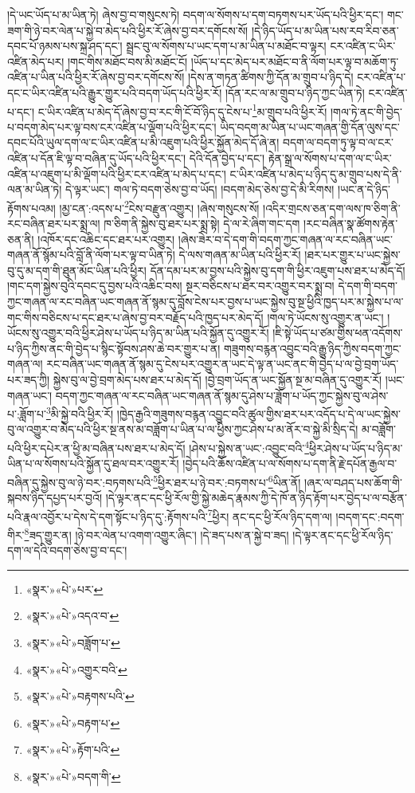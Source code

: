 །དེ་ཡང་ཡོད་པ་མ་ཡིན་ཏེ། ཞེས་བྱ་བ་གསུངས་ཏེ། བདག་ལ་སོགས་པ་དག་བཏགས་པར་ཡོད་པའི་ཕྱིར་དང་། གང་ཟག་གི་ཉེ་བར་ལེན་པ་སྐྱེ་བ་མེད་པའི་ཕྱིར་རོ་ཞེས་བྱ་བར་དགོངས་སོ། །དེ་ཉིད་ཡོད་པ་མ་ཡིན་པས་རབ་རིབ་ཅན་དབང་པོ་ཉམས་པས་སྐྲ་ཤད་དང་། སྦྲང་བུ་ལ་སོགས་པ་ཡང་དག་པ་མ་ཡིན་པ་མཐོང་བ་ལྟར། ངར་འཛིན་ང་ཡིར་འཛིན་མེད་པར། །གང་གིས་མཐོང་བས་མི་མཐོང་ངོ། །ཡོད་པ་དང་མེད་པར་མཐོང་བ་ནི་ལོག་པར་ལྟ་བ་མཆོག་ཏུ་འཛིན་པ་ཡིན་པའི་ཕྱིར་རོ་ཞེས་བྱ་བར་དགོངས་སོ། །དེས་ན་གཏན་ཚིགས་ཀྱི་དོན་མ་གྲུབ་པ་ཉིད་དེ། ངར་འཛིན་པ་དང་ང་ཡིར་འཛིན་པའི་རྒྱུར་གྱུར་པའི་བདག་ཡོད་པའི་ཕྱིར་རོ། །དོན་རང་ལ་མ་གྲུབ་པ་ཉིད་ཀྱང་ཡིན་ཏེ། ངར་འཛིན་པ་དང་། ང་ཡིར་འཛིན་པ་མེད་དོ་ཞེས་བྱ་བ་རང་གི་ངོ་བོ་ཉིད་དུ་ངེས་པ་\footnote{«སྣར་»«པེ་»པར་}མ་གྲུབ་པའི་ཕྱིར་རོ། །གལ་ཏེ་ནང་གི་བྱེད་པ་བདག་མེད་པར་ལྟ་བས་ངར་འཛིན་པ་ལྡོག་པའི་ཕྱིར་དང་། ཡིད་བདག་མ་ཡིན་པ་ཡང་གཞན་གྱི་དོན་ལུས་དང་དབང་པོའི་ཡུལ་དག་ལ་ང་ཡིར་འཛིན་པ་མི་འཇུག་པའི་ཕྱིར་སྐྱོན་མེད་དོ་ཞེ་ན། བདག་ལ་བདག་ཏུ་ལྟ་བ་ལ་ངར་འཛིན་པ་དོན་ཇི་ལྟ་བ་བཞིན་དུ་ཡོད་པའི་ཕྱིར་དང་། དེའི་དོན་བྱེད་པ་དང་། རྟེན་སྒྲ་ལ་སོགས་པ་དག་ལ་ང་ཡིར་འཛིན་པ་འཇུག་པ་མི་ལྡོག་པའི་ཕྱིར་ངར་འཛིན་པ་མེད་པ་དང་། ང་ཡིར་འཛིན་པ་མེད་པ་ཉིད་དུ་མ་གྲུབ་པས་དེ་ནི་ལན་མ་ཡིན་ཏེ། དེ་ལྟར་ཡང་། གལ་ཏེ་བདག་ཅེས་བྱ་བ་ཡོད། །བདག་མེད་ཅེས་བྱ་དེ་མི་རིགས། །ཡང་ན་དེ་ཉིད་རྟོགས་པའམ། །མྱ་ངན་:འདས་པ་\footnote{«སྣར་»«པེ་»འདའ་བ་}ངེས་བརྫུན་འགྱུར། །ཞེས་གསུངས་སོ། །འདིར་གྲངས་ཅན་དག་ལས་ཁ་ཅིག་ནི་རང་བཞིན་ཐར་པར་སྨྲ་ལ། ཁ་ཅིག་ནི་སྐྱེས་བུ་ཐར་པར་སྨྲ་སྟེ། དེ་ལ་རེ་ཞིག་གང་དག །རང་བཞིན་སྣ་ཚོགས་རྟེན་ཅན་ནི། །འཁོར་དང་འཆིང་དང་ཐར་པར་འགྱུར། །ཞེས་ཟེར་བ་དེ་དག་གི་བདག་ཀྱང་གཞན་ལ་རང་བཞིན་ཡང་གཞན་ནོ་སྙོམ་པའི་བློ་ནི་ལོག་པར་ལྟ་བ་ཡིན་ཏེ། དེ་ལས་གཞན་མ་ཡིན་པའི་ཕྱིར་རོ། །ཐར་པར་གྱུར་པ་ཡང་སྐྱེས་བུ་དུ་མ་དག་གི་ཐུན་མོང་ཡིན་པའི་ཕྱིར། དོན་དམ་པར་མ་བྱས་པའི་སྐྱེས་བུ་དག་གི་ཕྱིར་འཇུག་པས་ཐར་པ་མེད་དོ། །གང་དག་སྐྱེས་བུའི་དབང་དུ་བྱས་པའི་འཆིང་བས། སྔར་བཅིངས་པ་ཐར་བར་འགྱུར་བར་སྨྲ་བ། དེ་དག་གི་བདག་ཀྱང་གཞན་ལ་རང་བཞིན་ཡང་གཞན་ནོ་སྙམ་དུ་བློས་ངེས་པར་བྱས་པ་ཡང་སྐྱེས་བུ་སྔ་ཕྱིའི་ཁྱད་པར་མ་སྐྱེས་པ་ལ་གང་གིས་བཅིངས་པ་དང་ཐར་པ་ཞེས་བྱ་བར་བརྗོད་པའི་ཁྱད་པར་མེད་དོ། །གལ་ཏེ་ཡོངས་སུ་འགྱུར་ན་ཡང་། །ཡོངས་སུ་འགྱུར་བའི་ཕྱིར་ཤེས་པ་ཡོད་པ་ཉིད་མ་ཡིན་པའི་སྐྱོན་དུ་འགྱུར་རོ། །ཇི་སྟེ་ཡོད་པ་ཙམ་གྱིས་ཕན་འདོགས་པ་ཉིད་ཀྱིས་ནང་གི་བྱེད་པ་སྙིང་སྟོབས་ཤས་ཆེ་བར་གྱུར་པ་ན། གཟུགས་བརྙན་འབྱུང་བའི་རྒྱུ་ཉིད་ཀྱིས་བདག་ཀྱང་གཞན་ལ། རང་བཞིན་ཡང་གཞན་ནོ་སྙམ་དུ་ངེས་པར་འགྱུར་ན་ཡང་དེ་ལྟ་ན་ཡང་ནང་གི་བྱེད་པ་ལ་བྱེ་བྲག་ཡོད་པར་ཟད་ཀྱི། སྐྱེས་བུ་ལ་བྱེ་བྲག་མེད་པས་ཐར་པ་མེད་དོ། །བྱེ་བྲག་ཡོད་ན་ཡང་སྐྱོན་སྔ་མ་བཞིན་དུ་འགྱུར་རོ། །ཡང་གཞན་ཡང་། བདག་ཀྱང་གཞན་ལ་རང་བཞིན་ཡང་གཞན་ནོ་སྙམ་དུ་ཤེས་པ་ཟློག་པ་ཡོད་ཀྱང་སྐྱེས་བུ་ལ་ཤེས་པ་:ཟློག་པ་\footnote{«སྣར་»«པེ་»བཟློག་པ་}མི་སྐྱེ་བའི་ཕྱིར་རོ། །ཁྱེད་རྒྱའི་གཟུགས་བརྙན་འབྱུང་བའི་ཚུལ་གྱིས་ཐར་པར་འདོད་པ་དེ་ལ་ཡང་སྐྱེས་བུ་ལ་འགྱུར་བ་མེད་པའི་ཕྱིར་སྔ་ནས་མ་བཟློག་པ་ཡིན་པ་ལ་ཕྱིས་ཀྱང་ཤེས་པ་མ་ནོར་བ་སྐྱེ་མི་སྲིད་དེ། མ་བཟློག་པའི་ཕྱིར་དཔེར་ན་ཕྱི་མ་བཞིན་པས་ཐར་པ་མེད་དོ། །ཤེས་པ་སྐྱེས་ན་ཡང་:འབྱུང་བའི་\footnote{«སྣར་»«པེ་»འགྱུར་བའི་}ཕྱིར་ཤེས་པ་ཡོད་པ་ཉིད་མ་ཡིན་པ་ལ་སོགས་པའི་སྐྱོན་དུ་ཐལ་བར་འགྱུར་རོ། །བྱེད་པའི་ཆོས་འཛིན་པ་ལ་སོགས་པ་དག་ནི་རྗེ་དཔོན་རྒྱལ་བ་བཞིན་དུ་སྐྱེས་བུ་ལ་ཉེ་བར་:བཏགས་པའི་\footnote{«སྣར་»«པེ་»བརྟགས་པའི་}ཕྱིར་ཐར་པ་ཉེ་བར་:བཏགས་པ་\footnote{«སྣར་»«པེ་»བརྟག་པ་}ཡིན་ནོ། །ཞར་ལ་བཤད་པས་ཆོག་གི་སྐབས་ཉིད་དཔྱད་པར་བྱའོ། །དེ་ལྟར་ནང་དང་ཕྱི་རོལ་གྱི་སྐྱེ་མཆེད་རྣམས་ཀྱི་དེ་ཁོ་ན་ཉིད་རྟོག་པར་བྱེད་པ་ལ་བརྩོན་པའི་རྣལ་འབྱོར་པ་དེས་དེ་དག་སྟོང་པ་ཉིད་དུ་:རྟོགས་པའི་\footnote{«སྣར་»«པེ་»རྟོག་པའི་}ཕྱིར། ནང་དང་ཕྱི་རོལ་ཉིད་དག་ལ། །བདག་དང་:བདག་གིར་\footnote{«སྣར་»«པེ་»བདག་གི་}ཟད་གྱུར་ན། །ཉེ་བར་ལེན་པ་འགག་འགྱུར་ཞིང་། །དེ་ཟད་པས་ན་སྐྱེ་བ་ཟད། །དེ་ལྟར་ནང་དང་ཕྱི་རོལ་ཉིད་དག་ལ་དེའི་བདག་ཅེས་བྱ་བ་དང་། 